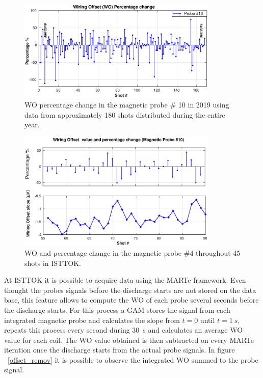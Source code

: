 \begin{figure}[htbp]
	\centering
	\includegraphics[width=0.85\textwidth]{Chp4/percentage_change.eps}
	\caption{\label{WO_percent} WO percentage change in the magnetic probe $\#$ 10  in 2019 using data from approximately  180 shots distributed during the entire year. }
\end{figure}

\begin{figure}[htbp]
	\centering
	\includegraphics[width=0.85\textwidth]{Chp4/valueAndpercentage_change10.eps}
	\caption{\label{WO_minr10} WO and percentage change in the magnetic probe $\#4$  throughout 45 shots in ISTTOK.}
\end{figure}

 At ISTTOK it is possible to acquire data using the MARTe framework. Even thought the probes signals before the discharge starts are not  stored on the data base, this feature allows to compute the WO of each probe several seconds before the discharge starts. For this process a GAM stores the signal from each integrated magnetic probe and calculates the slope from $t=0$ until $t=1~s$, repeats this process every second during  30~s and calculates an average WO value for each coil. The WO  value obtained  is then subtracted on every MARTe iteration once the discharge starts from the actual probe signals.   In  figure ~\ref{offset_remov} it is possible to observe the integrated WO summed to the probe signal.  \smallskip


